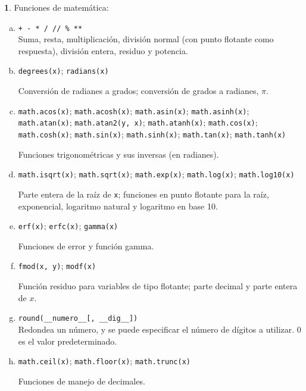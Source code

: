 \documentclass[12pt]{article}
\theoremstyle{definition}
\newtheorem{funcion}{}[section]
\begin{document}
\begin{funcion}
  Funciones de matem\'atica:
  \begin{enumerate}[a)]
    \item \verb|+ - * / // % **| \\[1ex]
  Suma, resta, multiplicaci\'on, divisi\'on normal (con punto flotante como respuesta), divisi\'on entera, residuo y potencia.

    \item \verb|degrees(x)|; \verb|radians(x)|

      Conversi\'on de radianes a grados; conversi\'on de grados a radianes, $\pi$.

\item \verb|math.acos(x)|;
      \verb|math.acosh(x)|;
      \verb|math.asin(x)|;
      \verb|math.asinh(x)|;
      \verb|math.atan(x)|;
      \verb|math.atan2(y, x)|;
      \verb|math.atanh(x)|;
      \verb|math.cos(x)|;
      \verb|math.cosh(x)|;
      \verb|math.sin(x)|;
      \verb|math.sinh(x)|;
      \verb|math.tan(x)|;
      \verb|math.tanh(x)|

      Funciones trigonom\'etricas y sus inversas (en radianes).

\item \verb|math.isqrt(x)|; \verb|math.sqrt(x)|; \verb|math.exp(x)|; \verb|math.log(x)|; \verb|math.log10(x)|

  Parte entera de la ra\'iz de \verb|x|; funciones en punto flotante para la ra\'iz, exponencial, logaritmo natural y logaritmo en base 10.

    \item \verb|erf(x)|; \verb|erfc(x)|; \verb|gamma(x)|

      Funciones de error y funci\'on gamma.

    \item \verb|fmod(x, y)|; \verb|modf(x)|
      
      Funci\'on residuo para variables de tipo flotante; parte decimal y parte entera de $x$.

\item \verb|round(__numero__[, __dig__])| \\[1ex]
  Redondea un n\'umero, y se puede especificar el n\'umero de d\'igitos a utilizar. 0 es el valor predeterminado.

    \item \verb|math.ceil(x)|;
      \verb|math.floor(x)|;
      \verb|math.trunc(x)|

      Funciones de manejo de decimales.


\end{enumerate}
\end{funcion}
\end{document}
